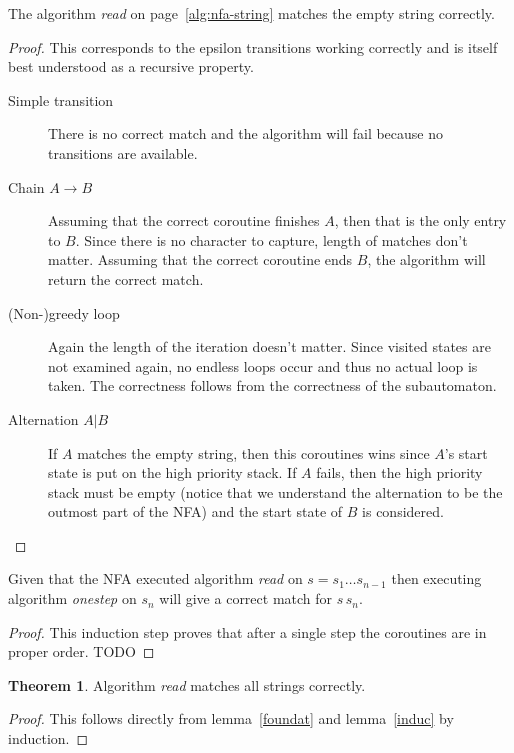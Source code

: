 \documentclass[11pt]{Thesis}
\theoremstyle{definition}
\newtheorem{thm}{Theorem}
\begin{document}
\begin{lemma}\label{foundat}
  The algorithm \emph{read} on page~\ref{alg:nfa-string} matches the empty string
  correctly.
\end{lemma}
\begin{proof}
  This corresponds to the epsilon transitions working correctly and is itself 
  best understood as a recursive property.

  \begin{description}
    \item[Simple transition] There is no correct match and the algorithm 
      will fail because no transitions are available.
    \item[Chain $A\rightarrow B$] Assuming that the correct coroutine 
      finishes $A$, then that is the only entry to $B$. Since there is no 
      character to capture, length of matches don't matter. Assuming that the 
      correct coroutine ends $B$, the algorithm will return the correct match.
    \item[(Non-)greedy loop] Again the length of the iteration doesn't 
      matter. Since visited states are not examined again, no endless loops 
      occur and thus no actual loop is taken. The correctness follows from 
      the correctness of the subautomaton.
    \item[Alternation $A|B$] If $A$ matches the empty string, then this 
      coroutines wins since $A$'s start state is put on the high priority stack.
      If $A$ fails, then the high priority stack must be empty (notice that 
      we understand the alternation to be the outmost part of the NFA) and 
      the start state of $B$ is considered.
  \end{description}
\end{proof}

\begin{lemma}\label{induc}
  Given that the NFA executed algorithm \emph{read} on $s=s_1\dots s_{n-1}$ 
  then executing algorithm \emph{onestep} on $s_{n}$ will give a correct 
  match for $s\,s_{n}$.
\end{lemma}
\begin{proof}
  This induction step proves that after a single step the coroutines are in 
  proper order.
  TODO
\end{proof}

\begin{thm}
  Algorithm \emph{read} matches all strings correctly.
\end{thm}
\begin{proof} This follows directly from lemma~\ref{foundat} and 
  lemma~\ref{induc} by induction.
\end{proof}
\end{document}
